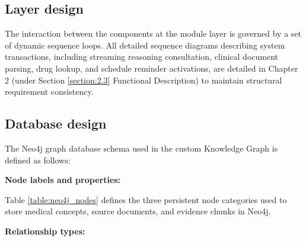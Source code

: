 \documentclass[../main.tex]{subfiles}
\begin{document}
\subsection{Layer design}
\label{subsection:4.2.2}

The interaction between the components at the module layer is governed by a set of dynamic sequence loops. All detailed sequence diagrams describing system transactions, including streaming reasoning consultation, clinical document parsing, drug lookup, and schedule reminder activations, are detailed in Chapter 2 (under Section \ref{section:2.3} Functional Description) to maintain structural requirement consistency.

\subsection{Database design}
\label{subsection:4.2.3}

The Neo4j graph database schema used in the custom Knowledge Graph is defined as follows:

\textbf{Node labels and properties:}
\begin{table}[H]
\centering
{}
\caption{Neo4j Node Labels and Properties}
\label{table:neo4j_nodes}
\end{table}

Table \ref{table:neo4j_nodes} defines the three persistent node categories used to store medical concepts, source documents, and evidence chunks in Neo4j.

\textbf{Relationship types:}
\begin{table}[H]
\centering
{}
\caption{Neo4j Relationship Types}
\label{table:neo4j_rels}
\end{table}
\end{document}

